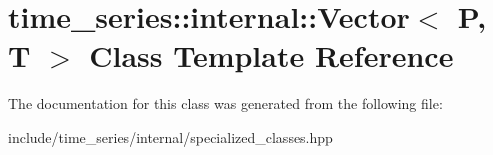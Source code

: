 \hypertarget{classtime__series_1_1internal_1_1Vector}{}\section{time\+\_\+series\+:\+:internal\+:\+:Vector$<$ P, T $>$ Class Template Reference}
\label{classtime__series_1_1internal_1_1Vector}


The documentation for this class was generated from the following file\+:\begin{DoxyCompactItemize}
\item 
include/time\+\_\+series/internal/specialized\+\_\+classes.\+hpp\end{DoxyCompactItemize}
